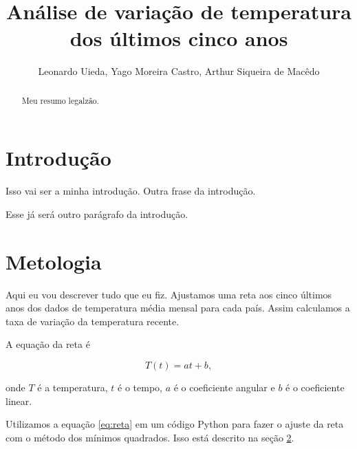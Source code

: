 \documentclass{article}
\begin{document}
\title{Análise de variação de temperatura dos últimos cinco anos}
\author{Leonardo Uieda, Yago Moreira Castro, Arthur Siqueira de Macêdo}

\maketitle

\begin{abstract}
Meu resumo legalzão.
\end{abstract}

\section{Introdução}

Isso vai ser a minha introdução.
Outra frase da introdução.

Esse já será outro parágrafo da introdução.

\section{Metologia}
\label{sec:metodos}

Aqui eu vou descrever tudo que eu fiz.
Ajustamos uma reta aos cinco últimos anos dos dados
de temperatura média mensal para cada país.
Assim calculamos a taxa de variação da temperatura recente.

A equação da reta é

\begin{equation}
T(t) = a t + b,
\label{eq:reta}
\end{equation}

\noindent
onde $T$ é a temperatura, $t$ é o tempo, $a$ é o coeficiente angular 
e $b$ é o coeficiente linear.

Utilizamos a equação \ref{eq:reta} em um código Python para fazer o ajuste da 
reta com o método dos mínimos quadrados. 
Isso está descrito na seção \ref{sec:metodos}.
\end{document}
